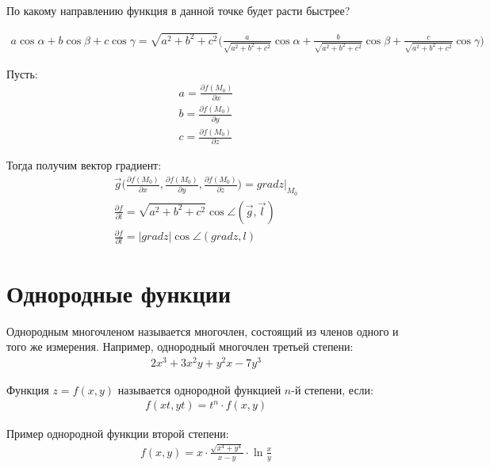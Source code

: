 \documentclass[a4paper,12pt,oneside]{extbook}
\theoremstyle{numbered}
\theoremstyle{unnumbered}
\theoremstyle{named}
\theoremstyle{unnumbered}
\theoremstyle{named}
\theoremstyle{named}
\theoremstyle{named}
\begin{document}
По какому направлению функция в данной точке будет расти быстрее?

\begin{gather*}
    a\cos{\alpha} + b\cos{\beta} + c\cos{\gamma} = \sqrt{a^2 + b^2 + c^2} \Big( \frac{a}{\sqrt{a^2 + b^2 + c^2}} \cos{\alpha} + \frac{b}{\sqrt{a^2 + b^2 + c^2}} \cos{\beta} + \frac{c}{\sqrt{a^2 + b^2 + c^2}} \cos{\gamma} \Big)
\end{gather*}

Пусть:
\begin{gather*}
    a = \frac{\partial f(M_0)}{\partial x} \\
    b = \frac{\partial f(M_0)}{\partial y} \\
    c = \frac{\partial f(M_0)}{\partial z}
\end{gather*}

Тогда получим вектор градиент:
\begin{gather*}
    \overrightarrow{g} \Big( \frac{\partial f(M_0)}{\partial x}, \frac{\partial f(M_0)}{\partial y}, \frac{\partial f(M_0)}{\partial z} \Big) = grad z \Big|_{M_0} \\
    \frac{\partial f}{\partial l} = \sqrt{a^2 + b^2 + c^2} \cos{\angle(\overrightarrow{g}, \overrightarrow{l})} \\
    \frac{\partial f}{\partial l} = |grad z| \cos{\angle(grad z, l)}
\end{gather*}

\section{Однородные функции}%
\label{sec:Однородные функции}

\begin{siderules}
    Однородным многочленом называется многочлен, состоящий из членов одного и того же измерения. Например, однородный многочлен третьей степени:
    \begin{gather*}
        2x^3 + 3x^2y + y^2x - 7y^3
    \end{gather*}
\end{siderules}

\begin{siderules}
    Функция \(z = f(x, y)\) называется однородной функцией \(n\)-й степени, если:
    \begin{gather*}
        f(xt, yt) = t^n \cdot f(x, y)
    \end{gather*}

    Пример однородной функции второй степени:
    \begin{gather*}
        f(x, y) = x \cdot \frac{\sqrt{x^4 + y^4}}{x - y} \cdot \ln{\frac{x}{y}}
    \end{gather*}
\end{siderules}
\end{document}

